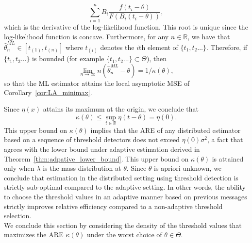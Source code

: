 \documentclass[letterpaper, 11pt]{IEEEtran}      %
\begin{document}
\begin{equation}
\label{eq:ML}
\sum_{i=1}^n B_i \frac{f \left( t_i-\theta\right) }{F \left(B_i  (t_i-\theta)\right) },  
\end{equation}
which is the derivative of the log-likelihood function. This root is unique since the log-likelihood function is concave. Furthermore, for any $n \in \mathbb R$, we have that $\hat{\theta}^{ML}_n  \in [t_{(1)}, t_{(n)}]$ where $t_{(i)}$ denotes the $i$th element of $\{t_1,t_2\ldots\}$. Therefore, if $\{t_1,t_2\ldots\}$ is bounded (for example $\{t_1,t_2\ldots\} \subset \Theta$), then 
\[
\lim_{n\to \infty} n\left(\hat{\theta}^{ML}_n - \theta \right)  = 1/\kappa(\theta), 
\] 
so that the ML estimator attains the local asymptotic MSE of Corollary~\ref{cor:LA_minimax}. \par
%
Since $\eta(x)$ attains its maximum at the origin, we conclude that
\[
\kappa(\theta) \leq \sup_{t\in \mathbb R} \eta \left( t-\theta\right) = \eta(0).
\]
This upper bound on $\kappa(\theta)$ implies that the ARE of any distributed estimator based on a sequence of threshold detectors does not exceed $\eta(0)\sigma^2$, a fact that agrees with the lower bound under adaptive estimation derived in Theorem~\ref{thm:adpative_lower_bound}. 
%
This upper bound on $\kappa(\theta)$ is attained only when $\lambda$ is the mass distribution at $\theta$. Since $\theta$ is apriori unknown, we conclude that estimation in the distributed setting using threshold detection is strictly sub-optimal compared to the adaptive setting. In other words, the ability to choose the threshold values in an adaptive manner based on previous messages strictly improves relative efficiency compared to a non-adaptive threshold selection.  \\


%
We conclude this section by considering the density of the threshold values that maximizes the ARE $\kappa(\theta)$ under the worst choice of $\theta \in \Theta$.
\end{document}
